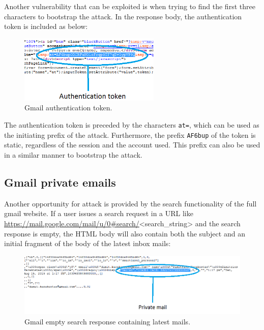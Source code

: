 Another vulnerability that can be exploited is when trying to find the first
three characters to bootstrap the attack. In the response body, the
authentication token is included as below:

\begin{figure}[h] \caption{Gmail authentication token.} \centering
\includegraphics[width=0.6\textwidth]{diagrams/gmail_bootstrap.png}\end{figure}

The authentication token is preceded by the characters \texttt{at=}, which can
be used as the initiating prefix of the attack. Furthermore, the prefix
\texttt{AF6bup} of the token is static, regardless of the session and the
account used. This prefix can also be used in a similar manner to bootstrap the
attack.

\subsection{Gmail private emails}\label{subsec:gmail_mail}

Another opportunity for attack is provided by the search functionality of the
full gmail website. If a user issues a search request in a URL like
\url{https://mail.google.com/mail/u/0#search/}<search\_string> and the search
response is empty, the HTML body will also contain both the subject and an
initial fragment of the body of the latest inbox mails:

\begin{figure}[h] \caption{Gmail empty search response containing latest mails.}
\centering
\includegraphics[width=1.1\textwidth]{diagrams/gmail_plain_response.png}\end{figure}

